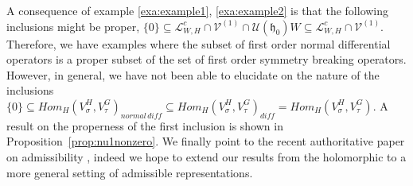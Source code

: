 \documentclass[12pt]{amsart}
\theoremstyle{definition}
\theoremstyle{remark}
\newcommand{\h}{\mathfrak{h}}
\numberwithin{equation}{section}
\begin{document}
    A consequence of   example \ref{exa:example1}, \ref{exa:example2} is that the following inclusions  might be proper,
  $ \{0\}\subseteq   \mathcal L_{W,H}^c \cap \mathcal V^{(1)} \cap \mathcal U(\h_0)W \subseteq  \mathcal L_{W,H}^c\cap \mathcal V^{(1)}  $. Therefore, we have examples where the subset of first order normal differential operators is a proper subset of the set of first order symmetry breaking operators.   However, in general, we have not been able to elucidate on the nature of the inclusions $\{0\} \subseteq Hom_H(V_\sigma^H, V_\tau^G)_{normal\,diff}\subseteq Hom_H(V_\sigma^H, V_\tau^G)_{diff}=Hom_H(V_\sigma^H, V_\tau^G)$. A result on the properness of the first inclusion is shown in Proposition~\ref{prop:nu1nonzero}.  We finally point to the recent authoritative paper on admissibility \cite{Os}, indeed we hope to extend our
results from the holomorphic to a more general setting of admissible representations.
\end{document}
